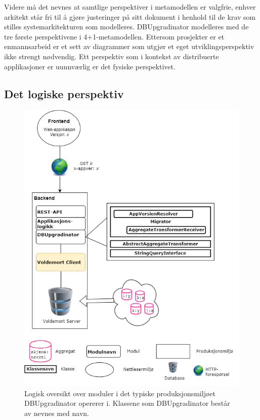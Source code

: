 Videre må det nevnes at samtlige perspektiver i metamodellen er valgfrie, enhver arkitekt står fri til å gjøre justeringer på sitt dokument i henhold til de krav som stilles systemarkitekturen som modelleres. DBUpgradinator modelleres med de tre første perspektivene i 4+1-metamodellen. Ettersom prosjekter er et enmannsarbeid er et sett av diagrammer som utgjør et eget utviklingsperspektiv ikke strengt nødvendig. Ett perspektiv som i kontekst av distribuerte applikasjoner er uunnværlig er det fysiske perspektivet.


\subsection{Det logiske perspektiv}
\begin{figure}[hbtp]
    \centering
    \includegraphics[scale=0.6]{fig/dbupgradinator-logisk-1.png}
    \caption{Logisk oversikt over moduler i det typiske produksjonsmiljøet DBUpgradinator opererer i. Klassene som DBUpgradinator består av nevnes med navn.}
    \label{fig5}
\end{figure}

